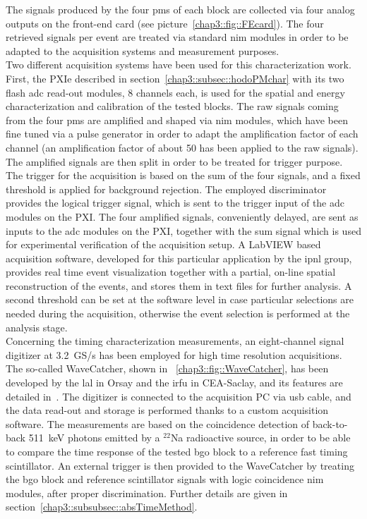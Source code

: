 The signals produced by the four \glspl{pm} of each block are collected via four analog outputs on the front-end card (see picture~\ref{chap3::fig::FEcard}). The four retrieved signals per event are treated via standard \gls{nim} modules in order to be adapted to the acquisition systems and measurement purposes.\\
Two different acquisition systems have been used for this characterization work. First, the PXIe described in section~\ref{chap3::subsec::hodoPMchar} with its two flash \gls{adc} read-out modules, 8 channels each, is used for the spatial and energy characterization and calibration of the tested blocks. The raw signals coming from the four \glspl{pm} are amplified and shaped via \gls{nim} modules, which have been fine tuned via a pulse generator in order to adapt the amplification factor of each channel (an amplification factor of about 50 has been applied to the raw signals). The amplified signals are then split in order to be treated for trigger purpose. The trigger for the acquisition is based on the sum of the four signals, and a fixed threshold is applied for background rejection. The employed discriminator provides the logical trigger signal, which is sent to the trigger input of the \gls{adc} modules on the PXI. The four amplified signals, conveniently delayed, are sent as inputs to the \gls{adc} modules on the PXI, together with the sum signal which is used for experimental verification of the acquisition setup. A LabVIEW based acquisition software, developed for this particular application by the \gls{ipnl} group, provides real time event visualization together with a partial, on-line spatial reconstruction of the events, and stores them in text files for further analysis. A second threshold can be set at the software level in case particular selections are needed during the acquisition, otherwise the event selection is performed at the analysis stage.\\
Concerning the timing characterization measurements, an eight-channel signal digitizer at 3.2~GS/s has been employed for high time resolution acquisitions. The so-called WaveCatcher, shown in \figurename~\ref{chap3::fig::WaveCatcher}, has been developed by the \gls{lal} in Orsay and the \gls{irfu} in CEA-Saclay, and its features are detailed in~\cite{Breton2014}. The digitizer is connected to the acquisition PC via \gls{usb} cable, and the data read-out and storage is performed thanks to a custom acquisition software.  The measurements are based on the coincidence detection of back-to-back 511~keV photons emitted by a $^{22}$Na radioactive source, in order to be able to compare the time response of the tested \gls{bgo} block to a reference fast timing scintillator. An external trigger is then provided to the WaveCatcher by treating the \gls{bgo} block and reference scintillator signals with logic coincidence \gls{nim} modules, after proper discrimination. Further details are given in section~\ref{chap3::subsubsec::absTimeMethod}.

